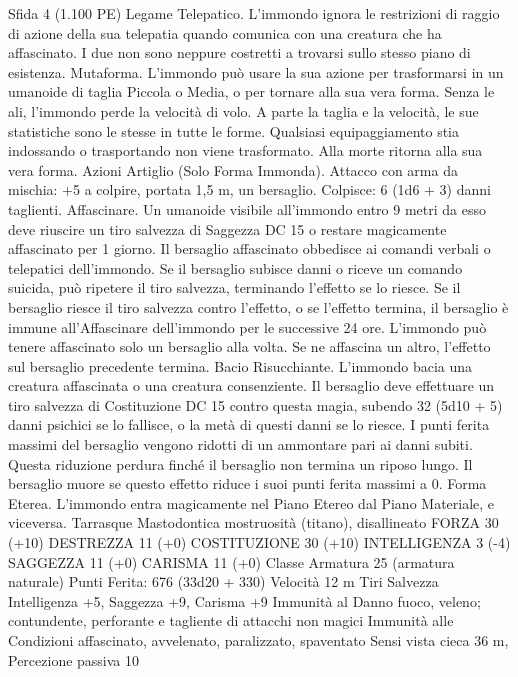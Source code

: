 \begin{multicols}{2}
Sfida 4 (1.100 PE)
Legame Telepatico. L’immondo ignora le restrizioni di raggio di
azione della sua telepatia quando comunica con una creatura che
ha affascinato. I due non sono neppure costretti a trovarsi sullo
stesso piano di esistenza.
Mutaforma. L’immondo può usare la sua azione per trasformarsi
in un umanoide di taglia Piccola o Media, o per tornare alla sua
vera forma. Senza le ali, l’immondo perde la velocità di volo. A
parte la taglia e la velocità, le sue statistiche sono le stesse in
tutte le forme. Qualsiasi equipaggiamento stia indossando o
trasportando non viene trasformato. Alla morte ritorna alla sua
vera forma.
Azioni
Artiglio (Solo Forma Immonda). Attacco con arma da mischia:
+5 a colpire, portata 1,5 m, un bersaglio.
Colpisce: 6 (1d6 + 3) danni taglienti.
Affascinare. Un umanoide visibile all’immondo entro 9 metri da
esso deve riuscire un tiro salvezza di Saggezza DC 15 o restare
magicamente affascinato per 1 giorno. Il bersaglio affascinato
obbedisce ai comandi verbali o telepatici dell’immondo. Se il
bersaglio subisce danni o riceve un comando suicida, può
ripetere il tiro salvezza, terminando l’effetto se lo riesce. Se il
bersaglio riesce il tiro salvezza contro l’effetto, o se l’effetto
termina, il bersaglio è immune all’Affascinare dell’immondo per
le successive 24 ore.
L’immondo può tenere affascinato solo un bersaglio alla volta.
Se ne affascina un altro, l’effetto sul bersaglio precedente
termina.
Bacio Risucchiante. L’immondo bacia una creatura affascinata o
una creatura consenziente. Il bersaglio deve effettuare un tiro
salvezza di Costituzione DC 15 contro questa magia, subendo 32
(5d10 + 5) danni psichici se lo fallisce, o la metà di questi danni
se lo riesce. I punti ferita massimi del bersaglio vengono ridotti
di un ammontare pari ai danni subiti. Questa riduzione perdura
finché il bersaglio non termina un riposo lungo. Il bersaglio
muore se questo effetto riduce i suoi punti ferita massimi a 0.
Forma Eterea. L’immondo entra magicamente nel Piano Etereo
dal Piano Materiale, e viceversa.
Tarrasque
Mastodontica mostruosità (titano), disallineato
FORZA 30 (+10)
DESTREZZA 11 (+0)
COSTITUZIONE 30 (+10)
INTELLIGENZA 3 (-4)
SAGGEZZA 11 (+0)
CARISMA 11 (+0)
Classe Armatura 25 (armatura naturale)
\hspace*{0pt}\hfill{Punti Ferita}: 676 (33d20 + 330)
Velocità 12 m
Tiri Salvezza Intelligenza +5, Saggezza +9, Carisma +9
Immunità al Danno fuoco, veleno; contundente, perforante e
tagliente di attacchi non magici
Immunità alle Condizioni affascinato, avvelenato, paralizzato,
spaventato
Sensi vista cieca 36 m, Percezione passiva 10

\end{multicols}
